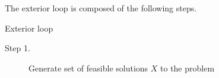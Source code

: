 

The exterior loop is composed of the following steps.

\begin{algorithm}[1]
\caption{Exterior loop}\label{extloop}
  
\end{algorithm}

\begin{description}
  \item[Step 1.] Generate set of feasible solutions $X$ to the problem
  
\end{description}
